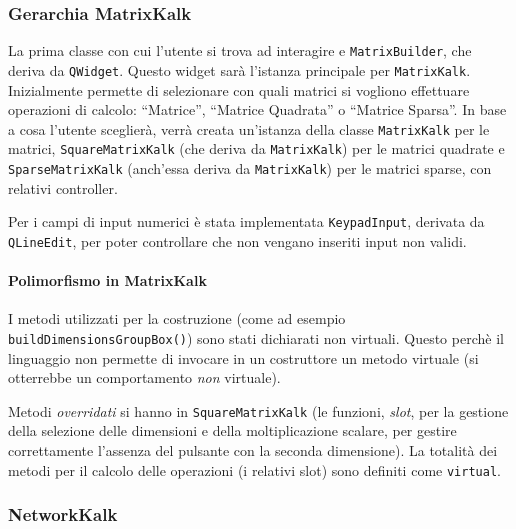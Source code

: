 \subsubsection{Gerarchia MatrixKalk}
La prima classe con cui l'utente si trova ad interagire e \texttt{MatrixBuilder}, che deriva da \texttt{QWidget}.
Questo widget sarà l'istanza principale per \texttt{MatrixKalk}. Inizialmente permette di selezionare con quali 
matrici si vogliono effettuare operazioni di calcolo: ``Matrice'', ``Matrice Quadrata'' o ``Matrice Sparsa''.
In base a cosa l'utente sceglierà, verrà creata un'istanza della classe \texttt{MatrixKalk} per le matrici, 
\texttt{SquareMatrixKalk} (che deriva da \texttt{MatrixKalk}) per le matrici quadrate e \texttt{SparseMatrixKalk} 
(anch'essa deriva da \texttt{MatrixKalk}) per le matrici sparse, con relativi controller.\par
Per i campi di input numerici è stata implementata \texttt{KeypadInput}, derivata da \texttt{QLineEdit}, per poter controllare che non vengano inseriti
input non validi.

\paragraph{Polimorfismo in MatrixKalk} I metodi utilizzati per la costruzione (come ad esempio \texttt{buildDimensionsGroupBox()}) sono 
stati dichiarati non virtuali. Questo
perchè il linguaggio non permette di invocare in un costruttore un metodo virtuale (si otterrebbe un comportamento \emph{non} virtuale). \par
Metodi \emph{overridati} si hanno in \texttt{SquareMatrixKalk} (le funzioni, \emph{slot}, per la gestione della selezione delle dimensioni
e della moltiplicazione scalare, per gestire correttamente l'assenza del pulsante con la seconda dimensione). La totalità dei 
metodi per il calcolo delle operazioni (i relativi slot) sono definiti come \texttt{virtual}.

\subsubsection{NetworkKalk}


